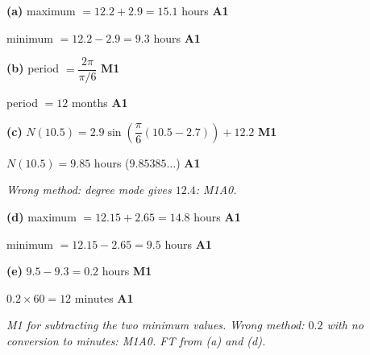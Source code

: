 \documentclass[12pt, twoside]{article}
\begin{document}
\begin{enumerate}[itemsep=0.3cm]
\textbf{(a)} maximum $= 12.2 + 2.9 = 15.1$ hours \hfill \textbf{A1}

minimum $= 12.2 - 2.9 = 9.3$ hours \hfill \textbf{A1}

\textbf{(b)} period $= \dfrac{2\pi}{\pi/6}$ \hfill \textbf{M1}

period $= 12$ months \hfill \textbf{A1}

\textbf{(c)} $N(10.5) = 2.9\sin\left(\dfrac{\pi}{6}(10.5 - 2.7)\right) + 12.2$
\hfill \textbf{M1}

$N(10.5) = 9.85$ hours \quad ($9.85385\ldots$) \hfill \textbf{A1}

\emph{Wrong method: degree mode gives $12.4$: M1A0.}

\textbf{(d)} maximum $= 12.15 + 2.65 = 14.8$ hours \hfill \textbf{A1}

minimum $= 12.15 - 2.65 = 9.5$ hours \hfill \textbf{A1}

\textbf{(e)} $9.5 - 9.3 = 0.2$ hours \hfill \textbf{M1}

$0.2 \times 60 = 12$ minutes \hfill \textbf{A1}

\emph{M1 for subtracting the two minimum values. Wrong method: $0.2$ with no
conversion to minutes: M1A0. FT from (a) and (d).}

\end{enumerate}
\end{document}
